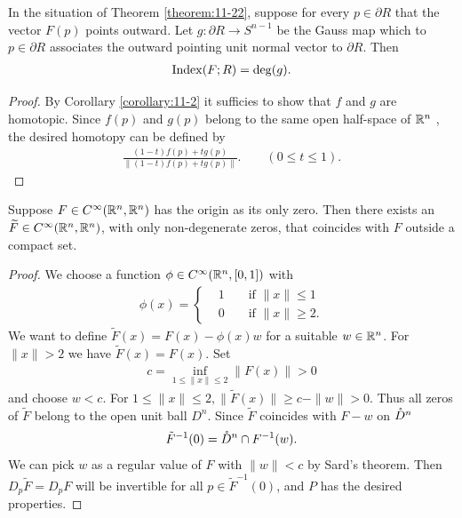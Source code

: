 \begin{corollary}\label{corollary:11-24}
  In the situation of Theorem \ref{theorem:11-22}, suppose for every $p\in\partial R$ that
  the vector $F(p)$ points outward. Let $g:\partial R\to S^{n-1}$ be the Gauss map which to
  $p\in\partial R$ associates the outward pointing unit normal vector to $\partial R$. Then
  \begin{align*}
    \mathrm{Index}(F; R) = \mathrm{deg}(g).
  \end{align*}
\end{corollary}

\begin{proof}
  By Corollary \ref{corollary:11-2} it sufficies to show that $f$ and $g$ are homotopic. Since
  $f(p)$ and $g(p)$ belong to the same open half-space of ${\mathbb{R}}^n$ , the desired homotopy
  can be defined by
  \begin{align*}
    \frac{(1-t)f(p) + tg(p)}{\|(1-t)f(p) + tg(p)\|}.\qquad (0\le t\le 1).
  \end{align*}
\end{proof}

\begin{lemma}\label{lemma:11-25}
  Suppose $F\in C^\infty({\mathbb{R}}^n, {\mathbb{R}}^n)$ has the origin as its only zero. Then
  there exists an $\widetilde F\in C^\infty({\mathbb{R}}^n, {\mathbb{R}}^n)$, with only non-degenerate zeros, that coincides
  with $F$ outside a compact set.
\end{lemma}

\begin{proof}
  We choose a function $\phi\in C^\infty({\mathbb{R}}^n, [0, 1])$ with 
  \begin{align*}
    \phi(x) = \left\{\begin{aligned}
      & 1 && \text{ if } \|x\|\le 1 \\
      & 0 && \text{ if } \|x\|\ge 2.
    \end{aligned}\right.
  \end{align*}
  We want to define $\tilde{F}(x) = F(x) - \phi(x)w$ for a suitable $w\in{\ensuremath{\mathbb{R}}}^n$. 
  For $\|x\|> 2$ we have $\tilde{F}(x) = F(x)$. Set
  \begin{align*}
    c = \inf_{1\le \|x\|\le 2} \|F(x)\| > 0
  \end{align*}
  and choose $w<c$. For $1\le\|x\|\le 2, \|\tilde{F}(x)\|\ge c-\|w\|>0$. Thus all 
  zeros of $\tilde{F}$ belong to the open unit ball $D^n$. Since $\tilde{F}$ coincides with 
  $F-w$ on $\mathring{D}^n$ 
  \begin{align*}
    \tilde{F}^{-1}(0) = \mathring{D}^n\cap F^{-1}(w).
  \end{align*}
  We can pick $w$ as a regular value of $F$ with $\|w\|<c$ by Sard's theorem. Then
  $D_p\tilde{F} = D_pF$ will be invertible for all $p\in\tilde{F}^{-1}(0)$, and $P$ has 
  the desired properties.
\end{proof}

